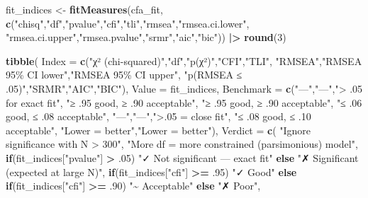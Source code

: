 \documentclass[
]{article}
\newenvironment{Shaded}{\begin{snugshade}}{\end{snugshade}}
\newcommand{\AttributeTok}[1]{\textcolor[rgb]{0.13,0.29,0.53}{#1}}
\newcommand{\ControlFlowTok}[1]{\textcolor[rgb]{0.13,0.29,0.53}{\textbf{#1}}}
\newcommand{\DecValTok}[1]{\textcolor[rgb]{0.00,0.00,0.81}{#1}}
\newcommand{\FunctionTok}[1]{\textcolor[rgb]{0.13,0.29,0.53}{\textbf{#1}}}
\newcommand{\NormalTok}[1]{#1}
\newcommand{\OtherTok}[1]{\textcolor[rgb]{0.56,0.35,0.01}{#1}}
\newcommand{\SpecialCharTok}[1]{\textcolor[rgb]{0.81,0.36,0.00}{\textbf{#1}}}
\newcommand{\StringTok}[1]{\textcolor[rgb]{0.31,0.60,0.02}{#1}}
\begin{document}
\begin{Shaded}
\begin{Highlighting}[]
\NormalTok{fit\_indices }\OtherTok{\textless{}{-}} \FunctionTok{fitMeasures}\NormalTok{(cfa\_fit,}
  \FunctionTok{c}\NormalTok{(}\StringTok{"chisq"}\NormalTok{,}\StringTok{"df"}\NormalTok{,}\StringTok{"pvalue"}\NormalTok{,}\StringTok{"cfi"}\NormalTok{,}\StringTok{"tli"}\NormalTok{,}\StringTok{"rmsea"}\NormalTok{,}\StringTok{"rmsea.ci.lower"}\NormalTok{,}
    \StringTok{"rmsea.ci.upper"}\NormalTok{,}\StringTok{"rmsea.pvalue"}\NormalTok{,}\StringTok{"srmr"}\NormalTok{,}\StringTok{"aic"}\NormalTok{,}\StringTok{"bic"}\NormalTok{)) }\SpecialCharTok{|\textgreater{}}
  \FunctionTok{round}\NormalTok{(}\DecValTok{3}\NormalTok{)}

\FunctionTok{tibble}\NormalTok{(}
  \AttributeTok{Index   =} \FunctionTok{c}\NormalTok{(}\StringTok{"χ² (chi{-}squared)"}\NormalTok{,}\StringTok{"df"}\NormalTok{,}\StringTok{"p(χ²)"}\NormalTok{,}\StringTok{"CFI"}\NormalTok{,}\StringTok{"TLI"}\NormalTok{,}
               \StringTok{"RMSEA"}\NormalTok{,}\StringTok{"RMSEA 95\% CI lower"}\NormalTok{,}\StringTok{"RMSEA 95\% CI upper"}\NormalTok{,}
               \StringTok{"p(RMSEA ≤ .05)"}\NormalTok{,}\StringTok{"SRMR"}\NormalTok{,}\StringTok{"AIC"}\NormalTok{,}\StringTok{"BIC"}\NormalTok{),}
  \AttributeTok{Value   =}\NormalTok{ fit\_indices,}
  \AttributeTok{Benchmark =} \FunctionTok{c}\NormalTok{(}\StringTok{"—"}\NormalTok{,}\StringTok{"—"}\NormalTok{,}\StringTok{"\textgreater{} .05 for exact fit"}\NormalTok{,}
                \StringTok{"≥ .95 good, ≥ .90 acceptable"}\NormalTok{,}
                \StringTok{"≥ .95 good, ≥ .90 acceptable"}\NormalTok{,}
                \StringTok{"≤ .06 good, ≤ .08 acceptable"}\NormalTok{,}
                \StringTok{"—"}\NormalTok{,}\StringTok{"—"}\NormalTok{,}\StringTok{"\textgreater{}.05 = close fit"}\NormalTok{,}
                \StringTok{"≤ .08 good, ≤ .10 acceptable"}\NormalTok{,}
                \StringTok{"Lower = better"}\NormalTok{,}\StringTok{"Lower = better"}\NormalTok{),}
  \AttributeTok{Verdict =} \FunctionTok{c}\NormalTok{(}
    \StringTok{"Ignore significance with N \textgreater{} 300"}\NormalTok{,}
    \StringTok{"More df = more constrained (parsimonious) model"}\NormalTok{,}
    \ControlFlowTok{if}\NormalTok{(fit\_indices[}\StringTok{"pvalue"}\NormalTok{] }\SpecialCharTok{\textgreater{}}\NormalTok{ .}\DecValTok{05}\NormalTok{) }\StringTok{"✓ Not significant — exact fit"} \ControlFlowTok{else} \StringTok{"✗ Significant (expected at large N)"}\NormalTok{,}
    \ControlFlowTok{if}\NormalTok{(fit\_indices[}\StringTok{"cfi"}\NormalTok{] }\SpecialCharTok{\textgreater{}=}\NormalTok{ .}\DecValTok{95}\NormalTok{) }\StringTok{"✓ Good"} \ControlFlowTok{else} \ControlFlowTok{if}\NormalTok{(fit\_indices[}\StringTok{"cfi"}\NormalTok{] }\SpecialCharTok{\textgreater{}=}\NormalTok{ .}\DecValTok{90}\NormalTok{) }\StringTok{"\textasciitilde{} Acceptable"} \ControlFlowTok{else} \StringTok{"✗ Poor"}\NormalTok{,}

\end{Highlighting}
\end{Shaded}
\end{document}
